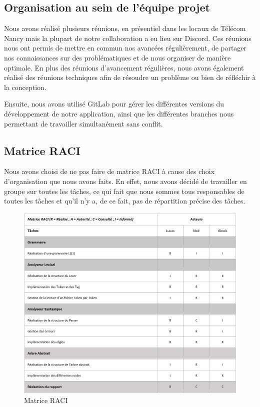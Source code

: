 \documentclass[french,a4paper]{article}
\begin{document}
    \subsection{Organisation au sein de l’équipe projet}\label{subsec:organisation-au-sein-de-lequipe-projet}
    Nous avons réalisé plusieurs réunions, en présentiel dans les locaux de Télécom Nancy mais la plupart de notre collaboration a eu lieu sur Discord. Ces réunions nous ont permis de mettre en commun nos avancées régulièrement, de partager nos connaissances sur des problématiques et de nous organiser de manière optimale.
    En plus des réunions d'avancement régulières, nous avons également réalisé des réunions techniques afin de résoudre un problème ou bien de réfléchir à la conception.

    Ensuite, nous avons utilisé GitLab pour gérer les différentes versions du développement de notre application, ainsi que les différentes
    branches nous permettant de travailler simultanément sans conflit.

    \subsection{Matrice RACI}\label{subsec:matrice-raci}
    Nous avons choisi de ne pas faire de matrice RACI à cause des choix d'organisation que nous avons faits. En effet,
    nous avons décidé de travailler en groupe sur toutes les tâches, ce qui fait que nous sommes tous responsables de toutes les tâches et qu'il n'y a, de ce fait,
    pas de répartition précise des tâches.

    \begin{figure}[H]
        \centering
        \includegraphics[width=1\textwidth]{RACI}
        \caption{Matrice RACI}\label{fig:figure3}
    \end{figure}
\end{document}
